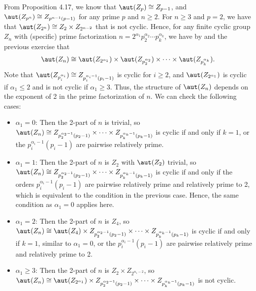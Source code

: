 \begin{sol}
    From Proposition 4.17, we know that $\aut(Z_p) \cong Z_{p - 1}$, and $\aut(Z_{p^n}) \cong Z_{p^{n - 1}(p - 1)}$ for any prime $p$ and $n \geq 2$.
	For $n \geq 3$ and $p = 2$, we have that $\aut(Z_{2^n}) \cong Z_2 \times Z_{2^{n - 2}}$ that is not cyclic.
	Hence, for any finite cyclic group $Z_n$ with (specific) prime factorization $n = 2^{\alpha_1} p_2^{\alpha_2} \cdots p_k^{\alpha_k}$, we have by  and the previous exercise that
    \[
    	\aut(Z_n) \cong \aut(Z_{2^{\alpha_1}}) \times \aut(Z_{p_2^{\alpha_2}}) \times \cdots \times \aut(Z_{p_k^{\alpha_k}}).
    \]
    Note that $\aut(Z_{p_i^{\alpha_i}}) \cong Z_{p_i^{\alpha_i - 1}(p_i - 1)}$ is cyclic for $i \geq 2$, and $\aut(Z_{2^{\alpha_1}})$ is cyclic if $\alpha_1 \leq 2$ and is not cyclic if $\alpha_1 \geq 3$.
	Thus, the structure of $\aut(Z_n)$ depends on the exponent of 2 in the prime factorization of $n$.
	We can check the following cases:
    \begin{itemize}
        \item $\alpha_1 = 0$: Then the 2-part of $n$ is trivial, so $\aut(Z_n) \cong Z_{p_2^{\alpha_2 - 1}(p_2 - 1)} \times \cdots \times Z_{p_k^{\alpha_k - 1}(p_k - 1)}$ is cyclic if and only if $k = 1$, or the $p_i^{\alpha_i - 1}(p_i - 1)$ are pairwise relatively prime.
        \item $\alpha_1 = 1$: Then the 2-part of $n$ is $Z_2$ with $\aut(Z_2)$ trivial, so $\aut(Z_n) \cong Z_{p_2^{\alpha_2 - 1}(p_2 - 1)} \times \cdots \times Z_{p_k^{\alpha_k - 1}(p_k - 1)}$ is cyclic if and only if the orders $p_i^{\alpha_i - 1}(p_i - 1)$ are pairwise relatively prime and relatively prime to 2, which is equivalent to the condition in the previous case.
	Hence, the same condition as $\alpha_1 = 0$ applies here.
        \item $\alpha_1 = 2$: Then the 2-part of $n$ is $Z_4$, so $\aut(Z_n) \cong \aut(Z_4) \times Z_{p_2^{\alpha_2 - 1}(p_2 - 1)} \times \cdots \times Z_{p_k^{\alpha_k - 1}(p_k - 1)}$ is cyclic if and only if $k = 1$, similar to $\alpha_1 = 0$, or the $p_i^{\alpha_i - 1}(p_i - 1)$ are pairwise relatively prime and relatively prime to 2.
        \item $\alpha_1 \geq 3$: Then the 2-part of $n$ is $Z_2 \times Z_{2^{\alpha_1 - 2}}$, so $\aut(Z_n) \cong \aut(Z_{2^{\alpha_1}}) \times Z_{p_2^{\alpha_2 - 1}(p_2 - 1)} \times \cdots \times Z_{p_k^{\alpha_k - 1}(p_k - 1)}$ is not cyclic. \qedhere
    \end{itemize}
\end{sol}

